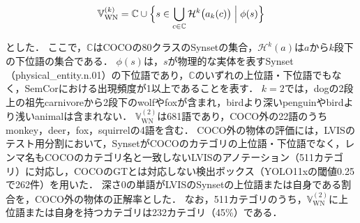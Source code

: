 \begin{equation}
    {\mathbb V}_{\mathrm{WN}}^{(k)} = {\mathbb C} \cup \Bigl\{ s \in \bigcup_{c \in {\mathbb C}} {\mathcal H}^{k}\bigl(a_k(c)\bigr) \Bigm| \phi(s) \Bigr\}
    \label{eq_wordnet_vocab}
\end{equation}

\noindent
とした．
ここで，$ {\mathbb C} $はCOCOの80クラスのSynsetの集合，$ {\mathcal H}^{k}(a) $は$ a $から$ k $段下の下位語の集合である．
$ \phi(s) $は，$ s $が物理的な実体を表すSynset（physical\_entity.n.01）の下位語であり，$ {\mathbb C} $のいずれの上位語・下位語でもなく，SemCor\cite{ref_SemCor}における出現頻度が1以上であることを表す．
$ k = 2 $では，dogの2段上の祖先carnivoreから2段下のwolfやfoxが含まれ，birdより深いpenguinやbirdより浅いanimalは含まれない．
$ {\mathbb V}_{\mathrm{WN}}^{(2)} $は681語であり，COCO外の22語のうちmonkey，deer，fox，squirrelの4語を含む．
COCO外の物体の評価には，LVISのテスト用分割において，SynsetがCOCOのカテゴリの上位語・下位語でなく，レンマ名もCOCOのカテゴリ名と一致しないLVISのアノテーション（511カテゴリ）に対応し，COCOのGTとは対応しない検出ボックス（YOLO11xの閾値0.25で262件）を用いた．
深さ0の単語がLVISのSynsetの上位語または自身である割合を，COCO外の物体の正解率とした．
なお，511カテゴリのうち，$ {\mathbb V}_{\mathrm{WN}}^{(2)} $に上位語または自身を持つカテゴリは232カテゴリ（45\%）である．

